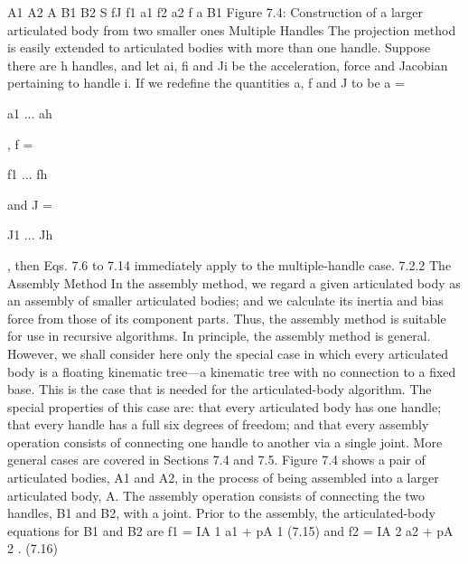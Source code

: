 A1 A2 A B1 B2 S fJ f1 a1 f2 a2 f a B1 Figure 7.4: Construction of a larger articulated body from two smaller ones Multiple Handles The projection method is easily extended to articulated bodies with more than one handle. Suppose there are h handles, and let ai, fi and Ji be the acceleration, force and Jacobian pertaining to handle i. If we redefine the quantities a, f and J to be a =

a1 ... ah

, f =

f1 ... fh

and J =

J1 ... Jh

, then Eqs. 7.6 to 7.14 immediately apply to the multiple-handle case. 7.2.2 The Assembly Method In the assembly method, we regard a given articulated body as an assembly of smaller articulated bodies; and we calculate its inertia and bias force from those of its component parts. Thus, the assembly method is suitable for use in recursive algorithms. In principle, the assembly method is general. However, we shall consider here only the special case in which every articulated body is a floating kinematic tree—a kinematic tree with no connection to a fixed base. This is the case that is needed for the articulated-body algorithm. The special properties of this case are: that every articulated body has one handle; that every handle has a full six degrees of freedom; and that every assembly operation consists of connecting one handle to another via a single joint. More general cases are covered in Sections 7.4 and 7.5. Figure 7.4 shows a pair of articulated bodies, A1 and A2, in the process of being assembled into a larger articulated body, A. The assembly operation consists of connecting the two handles, B1 and B2, with a joint. Prior to the assembly, the articulated-body equations for B1 and B2 are f1 = IA 1 a1 + pA 1 (7.15) and f2 = IA 2 a2 + pA 2 . (7.16)

